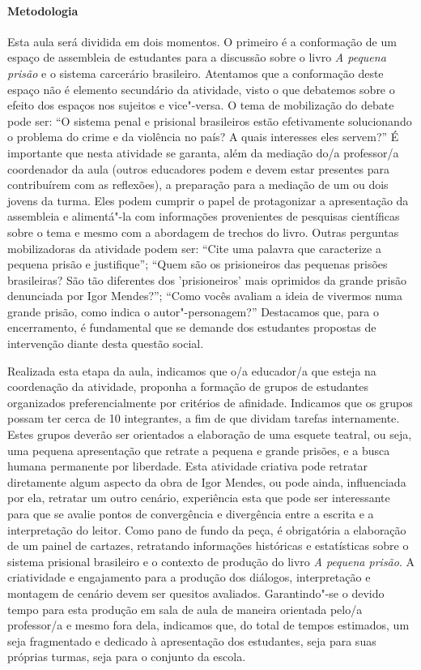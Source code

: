 \documentclass[11pt]{extarticle}
\begin{document}
\paragraph{Metodologia} Esta aula será dividida em dois momentos. O
primeiro é a conformação de um espaço de assembleia de estudantes para a
discussão sobre o livro \emph{A pequena prisão} e o sistema carcerário
brasileiro. Atentamos que a conformação deste espaço não é elemento
secundário da atividade, visto o que debatemos sobre o efeito dos
espaços nos sujeitos e vice"-versa. O tema de mobilização do debate pode
ser: ``O sistema penal e prisional brasileiros estão efetivamente
solucionando o problema do crime e da violência no país? A quais
interesses eles servem?'' É importante que nesta atividade se garanta, além
da mediação do/a professor/a coordenador da aula (outros educadores
podem e devem estar presentes para contribuírem com as reflexões), a
preparação para a mediação de um ou dois jovens da turma. Eles podem
cumprir o papel de protagonizar a apresentação da assembleia e
alimentá"-la com informações provenientes de pesquisas científicas sobre
o tema e mesmo com a abordagem de trechos do livro. Outras perguntas
mobilizadoras da atividade podem ser: ``Cite uma palavra que caracterize a
pequena prisão e justifique''; ``Quem são os prisioneiros das pequenas
prisões brasileiras? São tão diferentes dos 'prisioneiros' mais
oprimidos da grande prisão denunciada por Igor Mendes?''; ``Como vocês
avaliam a ideia de vivermos numa grande prisão, como indica o
autor"-personagem?'' Destacamos que, para o encerramento, é fundamental que
se demande dos estudantes propostas de intervenção diante desta questão
social.

Realizada esta etapa da aula, indicamos que o/a educador/a que esteja na
coordenação da atividade, proponha a formação de grupos de estudantes
organizados preferencialmente por critérios de afinidade. Indicamos que
os grupos possam ter cerca de 10 integrantes, a fim de que dividam
tarefas internamente. Estes grupos deverão ser orientados a elaboração
de uma esquete teatral, ou seja, uma pequena apresentação que retrate a
pequena e grande prisões, e a busca humana permanente por liberdade.
Esta atividade criativa pode retratar diretamente algum aspecto da obra
de Igor Mendes, ou pode ainda, influenciada por ela, retratar um outro
cenário, experiência esta que pode ser interessante para que se avalie
pontos de convergência e divergência entre a escrita e a interpretação
do leitor. Como pano de fundo da peça, é obrigatória a elaboração de um
painel de cartazes, retratando informações históricas e estatísticas
sobre o sistema prisional brasileiro e o contexto de produção do livro
\emph{A pequena prisão}. A criatividade e engajamento para a produção
dos diálogos, interpretação e montagem de cenário devem ser quesitos
avaliados. Garantindo"-se o devido tempo para esta produção em sala de
aula de maneira orientada pelo/a professor/a e mesmo fora dela,
indicamos que, do total de tempos estimados, um seja fragmentado e
dedicado à apresentação dos estudantes, seja para suas próprias turmas,
seja para o conjunto da escola.
\end{document}

